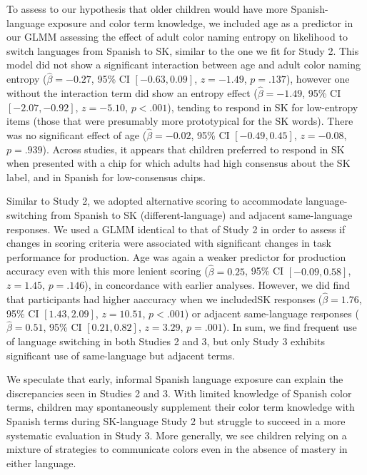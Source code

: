 \documentclass[
  english,
  ,man,floatsintext]{apa6}
\begin{document}
To assess to our hypothesis that older children would have more Spanish-language exposure and color term knowledge, we included age as a predictor in our GLMM assessing the effect of adult color naming entropy on likelihood to switch languages from Spanish to SK, similar to the one we fit for Study 2. This model did not show a significant interaction between age and adult color naming entropy (\(\hat{\beta} = -0.27\), 95\% CI \([-0.63, 0.09]\), \(z = -1.49\), \(p = .137\)), however one without the interaction term did show an entropy effect (\(\hat{\beta} = -1.49\), 95\% CI \([-2.07, -0.92]\), \(z = -5.10\), \(p < .001\)), tending to respond in SK for low-entropy items (those that were presumably more prototypical for the SK words). There was no significant effect of age (\(\hat{\beta} = -0.02\), 95\% CI \([-0.49, 0.45]\), \(z = -0.08\), \(p = .939\)). Across studies, it appears that children preferred to respond in SK when presented with a chip for which adults had high consensus about the SK label, and in Spanish for low-consensus chips.

Similar to Study 2, we adopted alternative scoring to accommodate language-switching from Spanish to SK (different-language) and adjacent same-language responses. We used a GLMM identical to that of Study 2 in order to assess if changes in scoring criteria were associated with significant changes in task performance for production. Age was again a weaker predictor for production accuracy even with this more lenient scoring (\(\hat{\beta} = 0.25\), 95\% CI \([-0.09, 0.58]\), \(z = 1.45\), \(p = .146\)), in concordance with earlier analyses. However, we did find that participants had higher aaccuracy when we includedSK responses (\(\hat{\beta} = 1.76\), 95\% CI \([1.43, 2.09]\), \(z = 10.51\), \(p < .001\)) or adjacent same-language responses (\(\hat{\beta} = 0.51\), 95\% CI \([0.21, 0.82]\), \(z = 3.29\), \(p = .001\)). In sum, we find frequent use of language switching in both Studies 2 and 3, but only Study 3 exhibits significant use of same-language but adjacent terms.

We speculate that early, informal Spanish language exposure can explain the discrepancies seen in Studies 2 and 3. With limited knowledge of Spanish color terms, children may spontaneously supplement their color term knowledge with Spanish terms during SK-language Study 2 but struggle to succeed in a more systematic evaluation in Study 3. More generally, we see children relying on a mixture of strategies to communicate colors even in the absence of mastery in either language.
\end{document}
